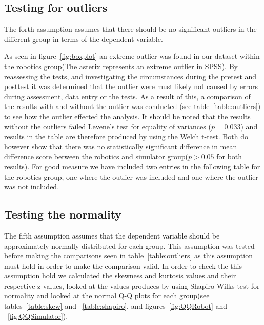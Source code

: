 \subsection{Testing for outliers}
The forth assumption assumes that there should be no significant outliers in the different group in terms of the dependent variable. 


\bigskip\noindent
As seen in figure~\ref{fig:boxplot} an extreme outlier was found in our dataset within the robotics group(The asterix represents an extreme outlier in SPSS). 
By reassessing the tests, and investigating the circumstances during the pretest and posttest it was determined that the outlier were must likely not caused by errors during assessment, data entry or the tests. 
As a result of this, a comparison of the results with and without the outlier was conducted (see table~\ref{table:outliers}) to see how the outlier effected the analysis. 
It should be noted that the results without the outliers failed Levene's test for equality of variances ($p = 0.033$) and results in the table are therefore produced by using the Welch t-test. 
Both do however show that there was no statistically significant difference in mean difference score between the robotics and simulator group($p > 0.05$ for both results).
For good measure we have included two entries in the following table for the robotics group, one where the outlier was included and one where the outlier was not included.


\bigskip\noindent
{}

\subsection{Testing the normality}
The fifth assumption assumes that the dependent variable should be approximately normally distributed for each group. This assumption was tested before making the comparisons seen in table~\ref{table:outliers} as this assumption must hold in order to make the comparison valid. 
In order to check the this assumption hold we calculated the skewness and kurtosis values and their respective z-values, looked at the values produces by using Shapiro-Wilks test for normality and looked at the normal Q-Q plots for each group(see tables~\ref{table:skew} and ~\ref{table:shapiro}, and figures~\ref{fig:QQRobot} and ~\ref{fig:QQSimulator}).

